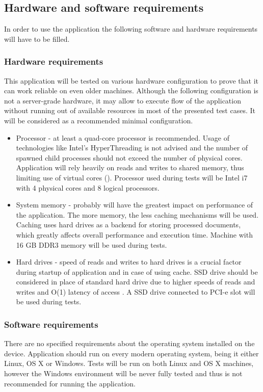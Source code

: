     

\subsection{Hardware and software requirements}
In order to use the application the following software and hardware requirements will have to be filled.

\subsubsection{Hardware requirements}
This application will be tested on various hardware configuration to prove that it can work reliable on even older machines. Although the following configuration is not a server-grade hardware, it may allow to execute flow of the application without running out of available resources in most of the presented test cases. It will be considered as a recommended minimal configuration.
\begin{itemize}
	\item Processor - at least a quad-core processor is recommended. Usage of technologies like Intel's HyperThreading is not advised and the number of spawned child processes should not exceed the number of physical cores. Application will rely heavily on reads and writes to shared memory, thus limiting use of virtual cores (\cite{performance_ht}). Processor used during tests will be Intel i7 with 4 physical cores and 8 logical processors.
	\item System memory - probably will have the greatest impact on performance of the application. The more memory, the less caching mechanisms will be used. Caching uses hard drives as a backend for storing processed documents, which greatly affects overall performance and execution time. Machine with 16 GB DDR3 memory will be used during tests.
	\item Hard drives - speed of reads and writes to hard drives is a crucial factor during startup of application and in case of using cache. SSD drive should be considered in place of standard hard drive due to higher speeds of reads and writes and O(1) latency of access \cite{performance_hdd_ssd}. A SSD drive connected to PCI-e slot will be used during tests.
\end{itemize}


\subsubsection{Software requirements}
There are no specified requirements about the operating system installed on the device. Application should run on every modern operating system, being it either Linux, OS X or Windows. Tests will be run on both Linux and OS X machines, however the Windows environment will be never fully tested and thus is not recommended for running the application.

